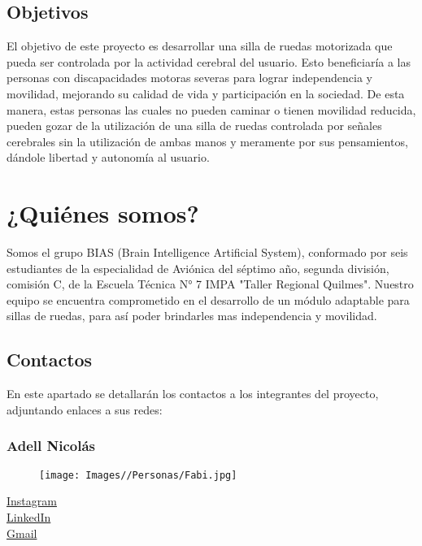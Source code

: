 \documentclass{article}
\begin{document}
\subsection{Objetivos}
El objetivo de este proyecto es desarrollar una silla de ruedas motorizada que pueda ser controlada por la actividad cerebral del usuario. Esto beneficiaría a las personas con discapacidades motoras severas para lograr independencia y movilidad, mejorando su calidad de vida y participación en la sociedad. De esta manera, estas personas las cuales no pueden caminar o tienen movilidad reducida, pueden gozar de la utilización de una silla de ruedas controlada por señales cerebrales sin la utilización de ambas manos y meramente por sus pensamientos, dándole libertad y autonomía al usuario.

\section{¿Quiénes somos?}
Somos el grupo BIAS (Brain Intelligence Artificial System), conformado por seis estudiantes de la especialidad de Aviónica del séptimo año, segunda división, comisión C, de la Escuela Técnica N° 7 IMPA "Taller Regional Quilmes". Nuestro equipo se encuentra comprometido en el desarrollo de un módulo adaptable para sillas de ruedas, para así poder brindarles mas independencia y movilidad.
\subsection{Contactos}

En este apartado se detallarán los contactos a los integrantes del proyecto, adjuntando enlaces a sus redes:

\subsubsection{Adell Nicolás}

\begin{minipage}[t]{0.3\textwidth}
\begin{figure}[H]
    \texttt{[image: Images//Personas/Fabi.jpg]}
\end{figure}
\end{minipage}
\begin{minipage}[t]{0.5\textwidth}
    \vspace{3.5em}
    \href{https://instagram.com/nicolas.adell}{Instagram} \\[1em]
    \href{http://www.linkedin.com/in/nicolas-adell-354508297}{LinkedIn} \\[1em]
    \href{mailto:nicolas.fabian2005@gmail.com}{Gmail}
\end{minipage}%
\end{document}
